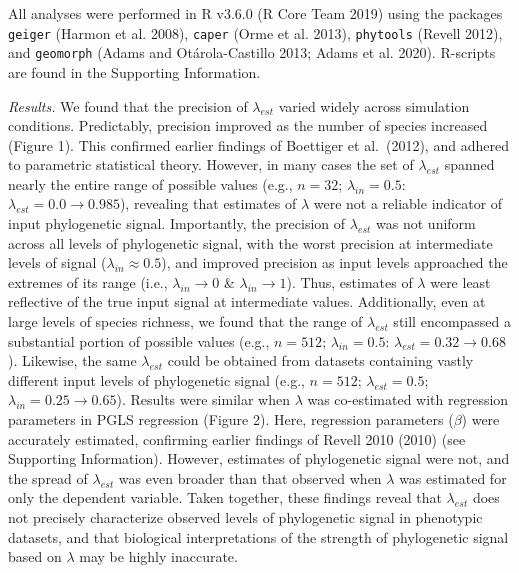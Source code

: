 \documentclass[
]{article}
\begin{document}
All analyses were performed in R v3.6.0 (R Core Team 2019) using the
packages \texttt{geiger} (Harmon et al. 2008), \texttt{caper} (Orme et
al. 2013), \texttt{phytools} (Revell 2012), and \texttt{geomorph} (Adams
and Otárola-Castillo 2013; Adams et al. 2020). R-scripts are found in
the Supporting Information. \hfill\break

\emph{Results.} We found that the precision of \(\lambda_{est}\) varied
widely across simulation conditions. Predictably, precision improved as
the number of species increased (Figure 1). This confirmed earlier
findings of Boettiger et al.~(2012), and adhered to parametric
statistical theory. However, in many cases the set of \(\lambda_{est}\)
spanned nearly the entire range of possible values (e.g., \(n=32\);
\(\lambda_{in}=0.5\): \(\lambda_{est}= 0.0\to 0.985\)), revealing that
estimates of \(\lambda\) were not a reliable indicator of input
phylogenetic signal. Importantly, the precision of \(\lambda_{est}\) was
not uniform across all levels of phylogenetic signal, with the worst
precision at intermediate levels of signal (\(\lambda_{in}\approx0.5\)),
and improved precision as input levels approached the extremes of its
range (i.e., \(\lambda_{in}\rightarrow0\) \&
\(\lambda_{in}\rightarrow1\)). Thus, estimates of \(\lambda\) were least
reflective of the true input signal at intermediate values.
Additionally, even at large levels of species richness, we found that
the range of \(\lambda_{est}\) still encompassed a substantial portion
of possible values (e.g., \(n=512\); \(\lambda_{in}=0.5\):
\(\lambda_{est} = 0.32\to 0.68\)). Likewise, the same \(\lambda_{est}\)
could be obtained from datasets containing vastly different input levels
of phylogenetic signal (e.g., \(n=512\); \(\lambda_{est} = 0.5\);
\(\lambda_{in} = 0.25 \to 0.65\)). Results were similar when \(\lambda\)
was co-estimated with regression parameters in PGLS regression (Figure
2). Here, regression parameters (\(\beta\)) were accurately estimated,
confirming earlier findings of Revell 2010 (2010) (see Supporting
Information). However, estimates of phylogenetic signal were not, and
the spread of \(\lambda_{est}\) was even broader than that observed when
\(\lambda\) was estimated for only the dependent variable. Taken
together, these findings reveal that \(\lambda_{est}\) does not
precisely characterize observed levels of phylogenetic signal in
phenotypic datasets, and that biological interpretations of the strength
of phylogenetic signal based on \(\lambda\) may be highly inaccurate.
\hfill\break
\end{document}
